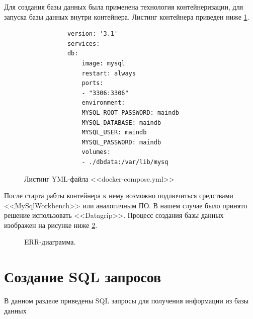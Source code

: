 \documentclass[14pt]{extreport}
\begin{document}
    Для создания базы данных была применена технология контейнеризации, для запуска базы данных внутри контейнера.%
    Листинг контейнера приведен ниже \ref{docker}.

    \begin{figure}[H]
        \begin{verbatim}
            version: '3.1'
            services:
            db:
                image: mysql
                restart: always
                ports:
                - "3306:3306"
                environment:
                MYSQL_ROOT_PASSWORD: maindb
                MYSQL_DATABASE: maindb
                MYSQL_USER: maindb
                MYSQL_PASSWORD: maindb
                volumes:
                - ./dbdata:/var/lib/mysq
        \end{verbatim}
        \caption{Листинг YML-файла <<docker-compose.yml>>}
        \label{docker}
    \end{figure}

    После старта рабты контейнера к нему возможно подлючиться средствами <<MySqlWorkbench>> или аналогичным ПО. %
    В нашем случае было принято решение использовать <<Datagrip>>. Процесс создания базы данных изображен на рисунке ниже \ref{create_db}.

    \begin{figure}[H]%
        \centering
        \caption{ERR-диаграмма.}
        \label{create_db} 
    \end{figure}


    
\section{Создание SQL запросов}
    В данном разделе приведены SQL запросы для получения информации из базы данных
\end{document}
